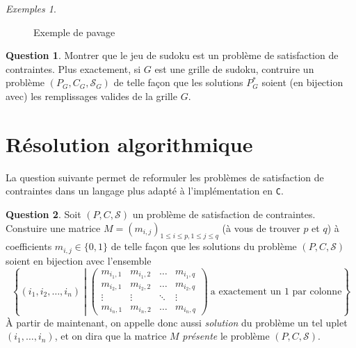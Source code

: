 \documentclass[french,a4paper]{article}
\theoremstyle{definition}
\newtheorem{question}{Question}
\theoremstyle{remark}
\newtheorem*{examples}{Exemples}
\begin{document}
\begin{examples}
\begin{enumerate}[label=(\arabic*)]
\begin{figure}[h!]
      \centering %
      \caption{Exemple de pavage}%
      \label{fig:tiling}%
    \end{figure}
  \end{enumerate}
\end{examples}

\begin{question}
  Montrer que le jeu de sudoku est un problème de satisfaction de
  contraintes. Plus exactement, si $G$ est une grille de sudoku,
  contruire un problème $(P_G,C_G,\mathcal S_G)$ de telle façon que
  les solutions $P_G^\ast$ soient (en bijection avec) les remplissages
  valides de la grille $G$.
\end{question}

\section{Résolution algorithmique}
\label{sec:algo-sol}%

La question suivante permet de reformuler les problèmes de
satisfaction de contraintes dans un langage plus adapté à
l'implémentation en {\tt C}.

\begin{question}
  Soit $(P,C,\mathcal S)$ un problème de satisfaction de
  contraintes. Constuire une matrice
  $M = (m_{i,j})_{1\leq i \leq p,1\leq j\leq q}$ (à vous de trouver
  $p$ et $q$) à coefficients $m_{i,j} \in \{0,1\}$ de telle façon que
  les solutions du problème $(P,C,\mathcal S)$ soient en bijection
  avec l'ensemble
  \begin{displaymath}
    \left\{
      (i_1,i_2,\dots,i_n) \middle| 
      \begin{pmatrix}
        m_{i_1,1} & m_{i_1,2} & \dots & m_{i_1,q} \\
        m_{i_2,1} & m_{i_2,2} & \dots & m_{i_2,q} \\
        \vdots & \vdots & \ddots & \vdots \\
        m_{i_n,1} & m_{i_n,2} & \dots & m_{i_n,q}
      \end{pmatrix} \
      \text{a exactement un $1$ par colonne}
    \right\}
  \end{displaymath}
  \`A partir de maintenant, on appelle donc aussi {\em solution} du
  problème un tel uplet $(i_1,\dots,i_n)$, et on dira que la matrice
  $M$ {\em présente} le problème $(P,C,\mathcal S)$.
\end{question}
\end{document}
